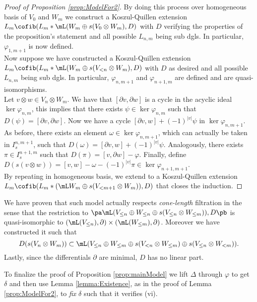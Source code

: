 \begin{proof}[Proof of Proposition \ref{prop:ModelFor2}]
By doing this process over homogeneous basis of $V_0$ and $W_m$ we construct a Koszul-Quillen extension $L_m\cofib (L_m*\mL(W_m\oplus s(V_0\otimes W_m),D)$ with $D$ verifying the properties of the proposition's statement and all possible $L_{n,m}$ being sub dgls. In particular, $\varphi_{1,m+1}$ is now defined.\\

Now suppose we have constructed a Koszul-Quillen extension $L_m\cofib (L_m*\mL(W_m\oplus s(V_{<n}\otimes W_m),D)$ with $D$ as desired and all possible $L_{n,m}$ being sub dgls. In particular, $\varphi_{n,m+1}$ and $\varphi_{n+1,m}$ are defined and are quasi-isomorphisms.\\ 

Let $v\otimes w\in V_n\otimes W_m$. We have that $[\partial v,\partial w]$ is a cycle in the acyclic ideal $\ker\varphi_{n,m}$, this implies that there exists $\psi\in\ker\varphi_{n,m}$ such that $D(\psi)=[\partial v,\partial w]$. Now we have a cycle $[\partial v,w]+(-1)^{|v|}\psi$ in $\ker\varphi_{n,m+1}$. As before, there exists an element $\omega\in \ker\varphi_{n,m+1}$, which can actually be taken in $I_s^{n,m+1}$, such that $D(\omega)=[\partial v,w]+(-1)^{|v|}\psi$. Analogously, there exists $\pi\in I_s^{n+1,m}$ such that $D(\pi)=[v,\partial w]-\varphi$. Finally, define $D(s(v\otimes w))=[v,w]-\omega-(-1)^{|v|}\pi\in \ker\varphi_{n+1,m+1}$.\\

By repeating in homogeneous basis, we extend to a Koszul-Quillen extension $L_m\cofib (L_m*(\mL W_m\oplus s(V_{<m+1}\otimes W_m)),D)$ that closes the induction.
\end{proof}

\begin{remark}
	We have proven that such model actually respects \emph{cone-length} filtration in the sense that the restriction to $\pa \mL(V_{\le n}\oplus W _{\le n}\oplus s(V_{\le n}\otimes W_{\le m}) ),D\pb$ is quasi-isomorphic to $(\mL (V_{\le n}),\partial)\times(\mL (W_{\le m}),\partial)$. Moreover we have constructed it such that\[D(s(V_n\otimes W_m))\subset \mL(V_{\le n}\oplus W_{\le m}\oplus s(V_{<n}\otimes W_{\le m})\oplus s(V_{\le n}\otimes W_{< m})).\] Lastly, since the differentials $\partial$ are minimal, $D$ has no linear part.
\end{remark}

To finalize the proof of Proposition \ref{prop:mainModel} we lift $\Delta$ through $\varphi$ to get $\delta$ and then use Lemma \ref{lemma:Existence}, as in the proof of Lemma \ref{prop:ModelFor2}, to \emph{fix} $\delta$ such that it verifies (vi). 

